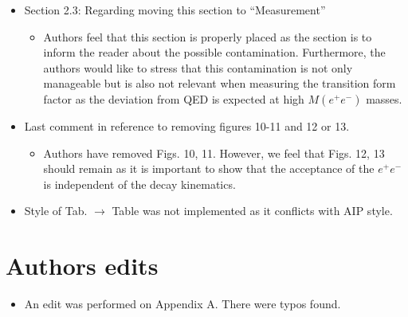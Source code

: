 \documentclass[10pt,a4paper]{report}
\begin{document}
\begin{itemize}
\begin{itemize}
	\end{itemize}
	\item Section 2.3: Regarding moving this section to ``Measurement'' 
	\begin{itemize}
		\item Authors feel that this section is properly placed as the section is to inform the reader about the possible contamination. Furthermore, the authors would like to stress that this contamination is not only manageable but is also not relevant when measuring the transition form factor as the deviation from QED is expected at high $M(e^+e^-)$ masses. 
	\end{itemize}
	\item Last comment in reference to removing figures 10-11 and 12 or 13.
	\begin{itemize}
		\item Authors have removed Figs. 10, 11. However, we feel that Figs. 12, 13 should remain as it is important to show that the acceptance of the $e^+e^-$ is independent of the decay kinematics.
	\end{itemize}
	\item Style of Tab. $\to$ Table was not implemented as it conflicts with AIP style.
\end{itemize}
\section*{Authors edits}
	\begin{itemize}
	\item An edit was performed on Appendix A. There were typos found.
	\end{itemize}
\end{document}
